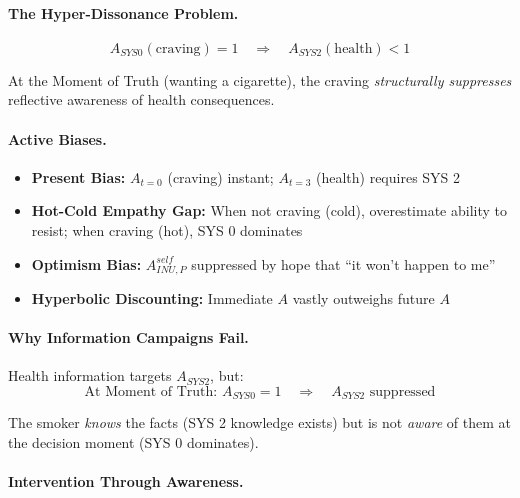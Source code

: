\paragraph{The Hyper-Dissonance Problem.}
\begin{equation}
A_{SYS0}(\text{craving}) = 1 \quad \Rightarrow \quad A_{SYS2}(\text{health}) < 1
\end{equation}

At the Moment of Truth (wanting a cigarette), the craving \emph{structurally 
suppresses} reflective awareness of health consequences.

\paragraph{Active Biases.}
\begin{itemize}
\item \textbf{Present Bias:} $A_{t=0}$ (craving) instant; $A_{t=3}$ (health) requires SYS 2
\item \textbf{Hot-Cold Empathy Gap:} When not craving (cold), overestimate ability 
to resist; when craving (hot), SYS 0 dominates
\item \textbf{Optimism Bias:} $A^{self}_{INU,P}$ suppressed by hope that ``it won't 
happen to me''
\item \textbf{Hyperbolic Discounting:} Immediate $A$ vastly outweighs future $A$
\end{itemize}

\paragraph{Why Information Campaigns Fail.}
Health information targets $A_{SYS2}$, but:
\begin{equation}
\text{At Moment of Truth: } A_{SYS0} = 1 \quad \Rightarrow \quad A_{SYS2} \text{ suppressed}
\end{equation}

The smoker \emph{knows} the facts (SYS 2 knowledge exists) but is not 
\emph{aware} of them at the decision moment (SYS 0 dominates).

\paragraph{Intervention Through Awareness.}

